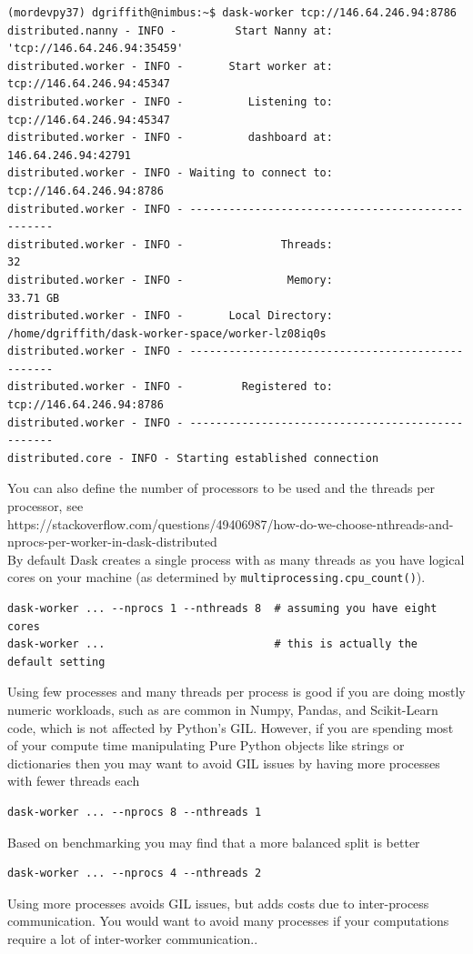 \begin{enumerate}
\begin{lstlisting}[style=tinysize]
(mordevpy37) dgriffith@nimbus:~$ dask-worker tcp://146.64.246.94:8786
distributed.nanny - INFO -         Start Nanny at: 'tcp://146.64.246.94:35459'
distributed.worker - INFO -       Start worker at:  tcp://146.64.246.94:45347
distributed.worker - INFO -          Listening to:  tcp://146.64.246.94:45347
distributed.worker - INFO -          dashboard at:        146.64.246.94:42791
distributed.worker - INFO - Waiting to connect to:   tcp://146.64.246.94:8786
distributed.worker - INFO - -------------------------------------------------
distributed.worker - INFO -               Threads:                         32
distributed.worker - INFO -                Memory:                   33.71 GB
distributed.worker - INFO -       Local Directory: /home/dgriffith/dask-worker-space/worker-lz08iq0s
distributed.worker - INFO - -------------------------------------------------
distributed.worker - INFO -         Registered to:   tcp://146.64.246.94:8786
distributed.worker - INFO - -------------------------------------------------
distributed.core - INFO - Starting established connection
\end{lstlisting}

You can also define the number of processors to be used and the threads per processor, see \\ https://stackoverflow.com/questions/49406987/how-do-we-choose-nthreads-and-nprocs-per-worker-in-dask-distributed\\

By default Dask creates a single process with as many threads as you have logical cores on your machine (as determined by \lstinline{multiprocessing.cpu_count()}).
\begin{lstlisting}
dask-worker ... --nprocs 1 --nthreads 8  # assuming you have eight cores
dask-worker ...                          # this is actually the default setting
\end{lstlisting}
Using few processes and many threads per process is good if you are doing mostly numeric workloads, such as are common in Numpy, Pandas, and Scikit-Learn code, which is not affected by Python's   \ac{GIL}.
However, if you are spending most of your compute time manipulating Pure Python objects like strings or dictionaries then you may want to avoid GIL issues by having more processes with fewer threads each
\begin{lstlisting}
dask-worker ... --nprocs 8 --nthreads 1
\end{lstlisting}
Based on benchmarking you may find that a more balanced split is better
\begin{lstlisting}
dask-worker ... --nprocs 4 --nthreads 2
\end{lstlisting}
Using more processes avoids GIL issues, but adds costs due to inter-process communication. You would want to avoid many processes if your computations require a lot of inter-worker communication..


\end{enumerate}
